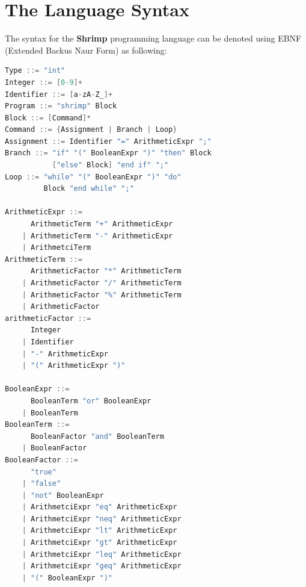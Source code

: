 \documentclass[12pt,a4paper]{article}
\begin{document}
\section*{The Language Syntax}
The syntax for the \textbf{Shrimp} programming language can be denoted using EBNF (Extended Backus Naur Form) as following:
\begin{lstlisting}[language=C, style=custom-style]
Type ::= "int"
Integer ::= [0-9]+
Identifier ::= [a-zA-Z_]+
Program ::= "shrimp" Block
Block ::= [Command]*
Command ::= {Assignment | Branch | Loop}
Assignment ::= Identifier "=" ArithmeticExpr ";"
Branch ::= "if" "(" BooleanExpr ")" "then" Block
           ["else" Block] "end if" ";"
Loop ::= "while" "(" BooleanExpr ")" "do"
         Block "end while" ";"

ArithmeticExpr ::=
      ArithmeticTerm "+" ArithmeticExpr
    | ArithmeticTerm "-" ArithmeticExpr
    | ArithmetciTerm
ArithmeticTerm ::=
      ArithmeticFactor "*" ArithmeticTerm
    | ArithmeticFactor "/" ArithmeticTerm
    | ArithmeticFactor "%" ArithmeticTerm
    | ArithmeticFactor
arithmeticFactor ::=
      Integer
    | Identifier
    | "-" ArithmeticExpr
    | "(" ArithmeticExpr ")"

BooleanExpr ::=
      BooleanTerm "or" BooleanExpr
    | BooleanTerm
BooleanTerm ::=
      BooleanFactor "and" BooleanTerm
    | BooleanFactor
BooleanFactor ::=
      "true"
    | "false"
    | "not" BooleanExpr
    | ArithmetciExpr "eq" ArithmeticExpr
    | ArithmetciExpr "neq" ArithmeticExpr
    | ArithmetciExpr "lt" ArithmeticExpr
    | ArithmetciExpr "gt" ArithmeticExpr
    | ArithmetciExpr "leq" ArithmeticExpr
    | ArithmetciExpr "geq" ArithmeticExpr
    | "(" BooleanExpr ")"
\end{lstlisting}
\end{document}
